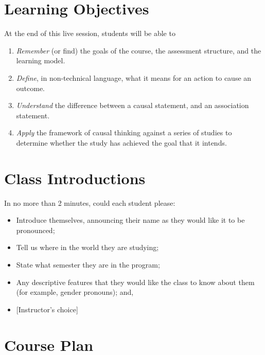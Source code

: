 \documentclass[
]{book}
\providecommand{\tightlist}{%
  \setlength{\itemsep}{0pt}\setlength{\parskip}{0pt}}
\begin{document}
\hypertarget{learning-objectives}{%
\section{Learning Objectives}\label{learning-objectives}}

At the end of this live session, students will be able to

\begin{enumerate}
\def\labelenumi{\arabic{enumi}.}
\tightlist
\item
  \emph{Remember} (or find) the goals of the course, the assessment
  structure, and the learning model.
\item
  \emph{Define}, in non-technical language, what it means for an action
  to cause an outcome.
\item
  \emph{Understand} the difference between a causal statement, and an
  association statement.
\item
  \emph{Apply} the framework of causal thinking against a series of
  studies to determine whether the study has achieved the goal that it
  intends.
\end{enumerate}

\hypertarget{class-introductions}{%
\section{Class Introductions}\label{class-introductions}}

In no more than 2 minutes, could each student please:

\begin{itemize}
\tightlist
\item
  Introduce themselves, announcing their name as they would like it to
  be pronounced;
\item
  Tell us where in the world they are studying;
\item
  State what semester they are in the program;
\item
  Any descriptive features that they would like the class to know about
  them (for example, gender pronouns); and,
\item
  {[}Instructor's choice{]}
\end{itemize}

\hypertarget{course-plan}{%
\section{Course Plan}\label{course-plan}}
\end{document}
